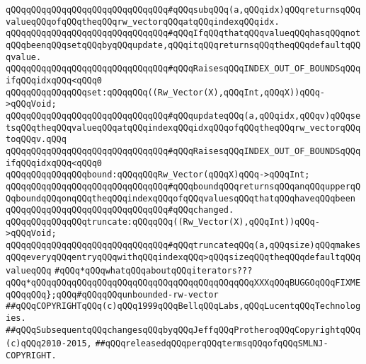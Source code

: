 \newline
\verb|qQQqqQQqqQQqqQQqqQQqqQQqqQQqqQQq#qQQqsubqQQq(a,qQQqidx)qQQqreturnsqQQqvalueqQQqofqQQqtheqQQqrw_vectorqQQqatqQQqindexqQQqidx.|\newline
\verb|qQQqqQQqqQQqqQQqqQQqqQQqqQQqqQQq#qQQqIfqQQqthatqQQqvalueqQQqhasqQQqnotqQQqbeenqQQqsetqQQqbyqQQqupdate,qQQqitqQQqreturnsqQQqtheqQQqdefaultqQQqvalue.|\newline
\verb|qQQqqQQqqQQqqQQqqQQqqQQqqQQqqQQq#qQQqRaisesqQQqINDEX_OUT_OF_BOUNDSqQQqifqQQqidxqQQq<qQQq0|\newline
\newline
\newline
\newline
\verb|qQQqqQQqqQQqqQQqset:qQQqqQQq((Rw_Vector(X),qQQqInt,qQQqX))qQQq->qQQqVoid;|\newline
\newline
\verb|qQQqqQQqqQQqqQQqqQQqqQQqqQQqqQQq#qQQqupdateqQQq(a,qQQqidx,qQQqv)qQQqsetsqQQqtheqQQqvalueqQQqatqQQqindexqQQqidxqQQqofqQQqtheqQQqrw_vectorqQQqtoqQQqv.qQQq|\newline
\verb|qQQqqQQqqQQqqQQqqQQqqQQqqQQqqQQq#qQQqRaisesqQQqINDEX_OUT_OF_BOUNDSqQQqifqQQqidxqQQq<qQQq0|\newline
\newline
\newline
\verb|qQQqqQQqqQQqqQQqbound:qQQqqQQqRw_Vector(qQQqX)qQQq->qQQqInt;|\newline
\newline
\verb|qQQqqQQqqQQqqQQqqQQqqQQqqQQqqQQq#qQQqboundqQQqreturnsqQQqanqQQqupperqQQqboundqQQqonqQQqtheqQQqindexqQQqofqQQqvaluesqQQqthatqQQqhaveqQQqbeen|\newline
\verb|qQQqqQQqqQQqqQQqqQQqqQQqqQQqqQQq#qQQqchanged.|\newline
\newline
\newline
\newline
\verb|qQQqqQQqqQQqqQQqtruncate:qQQqqQQq((Rw_Vector(X),qQQqInt))qQQq->qQQqVoid;|\newline
\newline
\verb|qQQqqQQqqQQqqQQqqQQqqQQqqQQqqQQq#qQQqtruncateqQQq(a,qQQqsize)qQQqmakesqQQqeveryqQQqentryqQQqwithqQQqindexqQQq>qQQqsizeqQQqtheqQQqdefaultqQQqvalueqQQq|\newline
\newline
\verb|#qQQq*qQQqwhatqQQqaboutqQQqiterators???qQQq*qQQqqQQqqQQqqQQqqQQqqQQqqQQqqQQqqQQqqQQqqQQqXXXqQQqBUGGOqQQqFIXME|\newline
\newline
\verb|qQQqqQQq};qQQq#qQQqqQQqunbounded-rw-vector|\newline
\newline
\newline
\newline
\verb|##qQQqCOPYRIGHTqQQq(c)qQQq1999qQQqBellqQQqLabs,qQQqLucentqQQqTechnologies.|\newline
\verb|##qQQqSubsequentqQQqchangesqQQqbyqQQqJeffqQQqProtheroqQQqCopyrightqQQq(c)qQQq2010-2015,|\newline
\verb|##qQQqreleasedqQQqperqQQqtermsqQQqofqQQqSMLNJ-COPYRIGHT.|\newline

